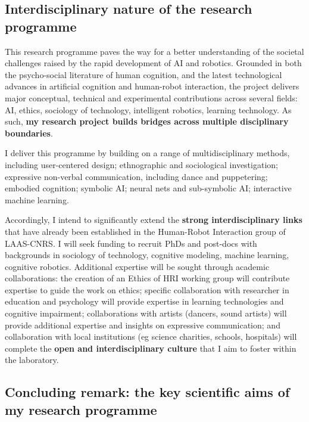 \subsection{Interdisciplinary nature of the research programme}

This research programme paves the way for a better understanding of the societal
challenges raised by the rapid development of AI and robotics. Grounded in both
the psycho-social literature of human cognition, and the latest technological
advances in artificial cognition and human-robot interaction, the project
delivers major conceptual, technical and experimental contributions across
several fields: AI, ethics, sociology of technology, intelligent robotics,
learning technology. As such, \textbf{my research project builds bridges across
multiple disciplinary boundaries}.

I deliver this programme by building on a range of multidisciplinary methods,
including user-centered design; ethnographic and sociological investigation;
expressive non-verbal communication, including dance and puppetering; embodied
cognition; symbolic AI; neural nets and sub-symbolic AI; interactive machine
learning.

Accordingly, I intend to significantly extend the \textbf{strong
interdisciplinary links} that have already been established in the Human-Robot
Interaction group of LAAS-CNRS. I will seek funding to recruit PhDs and
post-docs with backgrounds in sociology of technology, cognitive modeling,
machine learning, cognitive robotics. Additional expertise will be sought
through academic collaborations: the creation of an Ethics of HRI working group
will contribute expertise to guide the work on ethics; specific collaboration
with researcher in education and psychology will provide expertise in learning
technologies and cognitive impairment; collaborations with artists (dancers,
sound artists) will provide additional expertise and insights on expressive
communication; and collaboration with local institutions (eg science charities,
schools, hospitals) will complete the \textbf{open and interdisciplinary
culture} that I aim to foster within the laboratory.


\subsection{Concluding remark: the key scientific aims of my research programme}


